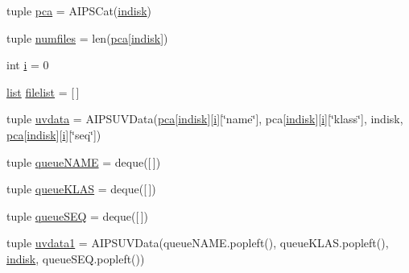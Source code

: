 \begin{DoxyCompactItemize}
tuple \hyperlink{namespacee_m_e_r_l_i_n__dbcon_ad71cfe913fce9baa62e0ea086283c28e}{pca} = \-A\-I\-P\-S\-Cat(\hyperlink{namespacee_m_e_r_l_i_n__dbcon_a3b3d57aefde6e9d540ecb3801fac5664}{indisk})
\item 
tuple \hyperlink{namespacee_m_e_r_l_i_n__dbcon_a5d477fadbfaebfae4c30eb008c302f01}{numfiles} = len(\hyperlink{namespacee_m_e_r_l_i_n__dbcon_ad71cfe913fce9baa62e0ea086283c28e}{pca}\mbox{[}\hyperlink{namespacee_m_e_r_l_i_n__dbcon_a3b3d57aefde6e9d540ecb3801fac5664}{indisk}\mbox{]})
\item 
int \hyperlink{namespacee_m_e_r_l_i_n__dbcon_a02dbe30556487e3ce9717f700e863dd7}{i} = 0
\item 
\hyperlink{namespacee_m_e_r_l_i_n__dbcon_ab058e469d8921bc98b806969ffd1e2a2}{list} \hyperlink{namespacee_m_e_r_l_i_n__dbcon_a8fd1244644d23f545f8a48a7713c73c5}{filelist} = \mbox{[}$\,$\mbox{]}
\item 
tuple \hyperlink{namespacee_m_e_r_l_i_n__dbcon_a2cd3578d0533cf504b1b59ae5521fe7a}{uvdata} = \-A\-I\-P\-S\-U\-V\-Data(\hyperlink{namespacee_m_e_r_l_i_n__dbcon_ad71cfe913fce9baa62e0ea086283c28e}{pca}\mbox{[}\hyperlink{namespacee_m_e_r_l_i_n__dbcon_a3b3d57aefde6e9d540ecb3801fac5664}{indisk}\mbox{]}\mbox{[}\hyperlink{namespacee_m_e_r_l_i_n__dbcon_a02dbe30556487e3ce9717f700e863dd7}{i}\mbox{]}\mbox{[}\char`\"{}name\char`\"{}\mbox{]}, pca\mbox{[}\hyperlink{namespacee_m_e_r_l_i_n__dbcon_a3b3d57aefde6e9d540ecb3801fac5664}{indisk}\mbox{]}\mbox{[}\hyperlink{namespacee_m_e_r_l_i_n__dbcon_a02dbe30556487e3ce9717f700e863dd7}{i}\mbox{]}\mbox{[}\char`\"{}klass\char`\"{}\mbox{]}, indisk, \hyperlink{namespacee_m_e_r_l_i_n__dbcon_ad71cfe913fce9baa62e0ea086283c28e}{pca}\mbox{[}\hyperlink{namespacee_m_e_r_l_i_n__dbcon_a3b3d57aefde6e9d540ecb3801fac5664}{indisk}\mbox{]}\mbox{[}\hyperlink{namespacee_m_e_r_l_i_n__dbcon_a02dbe30556487e3ce9717f700e863dd7}{i}\mbox{]}\mbox{[}\char`\"{}seq\char`\"{}\mbox{]})
\item 
tuple \hyperlink{namespacee_m_e_r_l_i_n__dbcon_a7d3a6f07cf87a01be51860872f9299f4}{queue\-N\-A\-M\-E} = deque(\mbox{[}$\,$\mbox{]})
\item 
tuple \hyperlink{namespacee_m_e_r_l_i_n__dbcon_a486d24d9ef703df2acee99e4e3817adb}{queue\-K\-L\-A\-S} = deque(\mbox{[}$\,$\mbox{]})
\item 
tuple \hyperlink{namespacee_m_e_r_l_i_n__dbcon_a0e55c34dc1aa2bca11dd0c616d8ece31}{queue\-S\-E\-Q} = deque(\mbox{[}$\,$\mbox{]})
\item 
tuple \hyperlink{namespacee_m_e_r_l_i_n__dbcon_ab9be6ea6704da37fee2dea65d409a370}{uvdata1} = \-A\-I\-P\-S\-U\-V\-Data(queue\-N\-A\-M\-E.\-popleft(), queue\-K\-L\-A\-S.\-popleft(), \hyperlink{namespacee_m_e_r_l_i_n__dbcon_a3b3d57aefde6e9d540ecb3801fac5664}{indisk}, queue\-S\-E\-Q.\-popleft())

\end{DoxyCompactItemize}
